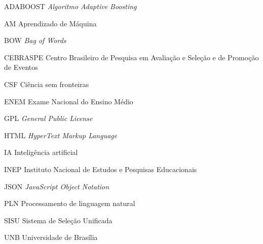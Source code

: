 \begin{basedescript}{\desclabelstyle{\pushlabel}\desclabelwidth{6em}}
\item[{ADABOOST} \textit{Algoritmo Adaptive Boosting}]%
\item[{AM}] Aprendizado de Máquina %
\item[{BOW}] \textit{Bag of Words}%
\item[{CEBRASPE}] Centro Brasileiro de Pesquisa em Avaliação e Seleção e de Promoção de Eventos%
\item[{CSF}] Ciência sem fronteiras%
\item[{ENEM}] Exame Nacional do Ensino Médio%
\item[{GPL}] \textit{General Public License} %
\item[{HTML}] \textit{HyperText Markup Language}%
\item[{IA}] Inteligência artificial%
\item[{INEP}] Instituto Nacional de Estudos e Pesquisas Educacionais%
\item[{JSON}] \textit{JavaScript Object Notation}%
\item[{PLN}] Processamento de linguagem natural%
\item[{SISU}] Sistema de Seleção Unificada%
\item[{UNB}] Universidade de Brasília%
\end{basedescript}